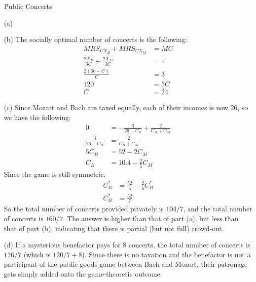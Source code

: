 \documentclass[10pt]{extarticle}
\begin{document}
\begin{problem}{Public Concerts}
\begin{problem}{(a)}
    \end{problem}
    \begin{problem}{(b)}
      The socially optimal number of concerts is the following:
      \begin{align*}
        MRS_{CX_B} + MRS_{CX_M} &= MC \\
        \frac{2 X_B}{3C} + \frac{2X_M}{3C} &= 1\\
        \frac{2(60-C)}{C} &= 3\\
        120 &= 5C\\
        C &= 24
      \end{align*}
    \end{problem}
    \begin{problem}{(c)}
      Since Mozart and Bach are taxed equally, each of their incomes is now $26$, so we have the following:
      \begin{align*}
        0 &= -\frac{3}{26-C_B} + \frac{2}{C_B + C_M}\\
        \frac{3}{26-C_B} &= \frac{2}{C_B + C_M}\\
        5C_B &= 52-2C_M\\
        C_B &= 10.4-\frac{2}{5}C_M
      \end{align*}
      Since the game is still symmetric:
      \begin{align*}
        C_B^* &= \frac{52}{5} - \frac{2}{5}C_B^*\\
        C_B^* &= \frac{52}{7}
      \end{align*}
      So the total number of concerts provided privately is $104/7$, and the total number of concerts is $160/7$. The answer is higher than that of part (a), but less than that of part (b), indicating that there is partial (but not full) crowd-out.
    \end{problem}
    \begin{problem}{(d)}
      If a mysterious benefactor pays for $8$ concerts, the total number of concerts is $176/7$ (which is $120/7 + 8$). Since there is no taxation and the benefactor is not a participant of the public goods game between Bach and Mozart, their patronage gets simply added onto the game-theoretic outcome.
    \end{problem}
  \end{problem}
\end{document}
